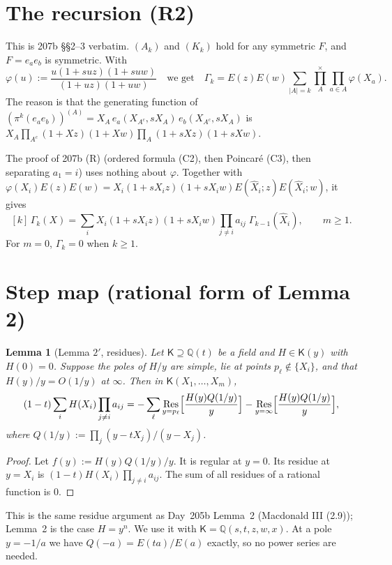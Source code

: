 \documentclass[11pt]{amsart}
\newtheorem{lemma}[theorem]{Lemma}
\theoremstyle{remark}
\newcommand{\hX}{\widehat{X}}
\newcommand{\cross}{\textstyle\prod^{\times}}
\newcommand{\Res}{\operatorname*{Res}}
\begin{document}
\section{The recursion (R2)}\label{sec:R2}

This is 207b \S\S2--3 verbatim. $(A_k)$ and $(K_k)$ hold for any symmetric $F$, and $F=e_ae_b$ is symmetric. With
\[
\varphi(u):=\frac{u(1+suz)(1+suw)}{(1+uz)(1+uw)}
\quad\text{we get}\quad
\Gamma_k=E(z)E(w)\sum_{|A|=k}\cross_A\prod_{a\in A}\varphi(X_a).
\]
The reason is that the generating function of $(\pi^k(e_ae_b))^{(A)}=X_A\,e_a(X_{A^c},sX_A)\,e_b(X_{A^c},sX_A)$ is $X_A\prod_{A^c}(1+Xz)(1+Xw)\prod_A(1+sXz)(1+sXw)$.

The proof of 207b (R) (ordered formula (C2), then Poincar\'e (C3), then separating $a_1=i$) uses nothing about $\varphi$. Together with $\varphi(X_i)E(z)E(w)=X_i(1+sX_iz)(1+sX_iw)E(\hX_i;z)E(\hX_i;w)$, it gives
\begin{equation}\tag{R2}
[k]\,\Gamma_k(X)=\sum_iX_i(1+sX_iz)(1+sX_iw)\prod_{j\ne i}a_{ij}\;\Gamma_{k-1}(\hX_i),\qquad m\ge1.
\end{equation}
For $m=0$, $\Gamma_k=0$ when $k\ge1$.

\section{Step map (rational form of Lemma 2)}\label{sec:step}

\begin{lemma}[Lemma $2'$, residues]\label{lem:2prime}
Let $\mathsf K\supseteq\mathbb{Q}(t)$ be a field and $H\in\mathsf K(y)$ with $H(0)=0$. Suppose the poles of $H/y$ are simple, lie at points $p_\ell\notin\{X_i\}$, and that $H(y)/y=O(1/y)$ at $\infty$. Then in $\mathsf K(X_1,\dots,X_m)$,
\[
(1-t)\sum_iH(X_i)\prod_{j\ne i}a_{ij}=-\sum_\ell\Res_{y=p_\ell}\Bigl[\frac{H(y)Q(1/y)}{y}\Bigr]-\Res_{y=\infty}\Bigl[\frac{H(y)Q(1/y)}{y}\Bigr],
\]
where $Q(1/y):=\prod_j(y-tX_j)/(y-X_j)$.
\end{lemma}
\begin{proof}
Let $f(y):=H(y)Q(1/y)/y$. It is regular at $y=0$. Its residue at $y=X_i$ is $(1-t)H(X_i)\prod_{j\ne i}a_{ij}$. The sum of all residues of a rational function is $0$.
\end{proof}

This is the same residue argument as Day~205b Lemma~2 (Macdonald III (2.9)); Lemma~2 is the case $H=y^n$. We use it with $\mathsf K=\mathbb{Q}(s,t,z,w,x)$. At a pole $y=-1/a$ we have $Q(-a)=E(ta)/E(a)$ exactly, so no power series are needed.
\end{document}

